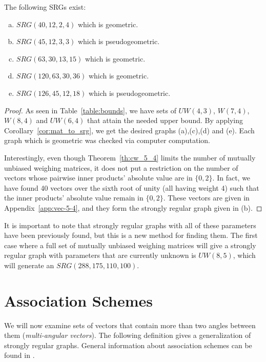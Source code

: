 \begin{corollary} \label{cor:srg_example}
 The following SRGs exist:
  \begin{enumerate}[(a)]
   \item $SRG(40,12,2,4)$ which is geometric.
   \item $SRG(45,12,3,3)$ which is pseudogeometric.
   \item $SRG(63,30,13,15)$ which is geometric.
   \item $SRG(120,63,30,36)$ which is geometric.
   \item $SRG(126,45,12,18)$ which is pseudogeometric.
  \end{enumerate}

\begin{proof}
 As seen in Table~\ref{table:bounds}, we have sets of $UW(4,3)$, $W(7,4)$, $W(8,4)$ and $UW(6,4)$ that attain the needed upper bound. By applying Corollary~\ref{cor:mat_to_srg}, we get the desired graphs (a),(c),(d) and (e). Each graph which is geometric was checked via computer computation.

 Interestingly, even though Theorem~\ref{th:cw_5_4} limits the number of mutually unbiased weighing matrices, it does not put a restriction on the number of vectors whose pairwise inner products' absolute value are in $\{0,2\}$. In fact, we have found 40 vectors over the sixth root of unity (all having weight 4) such that the inner products' absolute value remain in $\{0,2\}$. These vectors are given in Appendix~\ref{app:vec-5-4}, and they form the strongly regular graph given in (b).

\end{proof}
\end{corollary}

It is important to note that strongly regular graphs with all of these parameters have been previously found, but this is a new method for finding them. The first case where a full set of mutually unbiased weighing matrices will give a strongly regular graph with parameters that are currently unknown is $UW(8,5)$, which will generate an $SRG(288,175,110,100)$.

\section[Association Schemes]{Association Schemes}
\label{sec:ass-scheme}

We will now examine sets of vectors that contain more than two angles between them ({\it multi-angular vectors}). The following definition gives a generalization of strongly regular graphs. General information about association schemes can be found in \cite[Section VI(1)]{hcd}.

